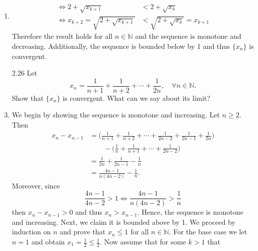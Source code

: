 \documentclass[12pt]{article}
\makeatletter
\theoremstyle{definition}
\theoremstyle{remark}
\renewenvironment{proof}[1][\proofname]{\par
  \pushQED{\qed}%
  \normalfont \topsep6\p@\@plus6\p@\relax
  \list{}{\leftmargin=0mm
          \rightmargin=4mm
          \settowidth{\itemindent}{\itshape#1}%
          \labelwidth=\itemindent
          \parsep=0pt \listparindent=\parindent 
  }
  \item[\hskip\labelsep
        \itshape
    #1\@addpunct{.}]\ignorespaces
}{%
  \popQED\endlist\@endpefalse
}
\let\oldproofname=\proofname
\renewcommand{\proofname}{\bf{\textit{\oldproofname}}}
\makeatother
\begin{document}
\begin{enumerate}[leftmargin=*]
\begin{proof}
\begin{equation*}
\begin{split}
                                \Leftrightarrow2+\sqrt{x_{k+1}}&<2+\sqrt{x_k} \\
                                \Leftrightarrow x_{k+2}=\sqrt{2+\sqrt{x_{k+1}}}&<\sqrt{2+\sqrt{x_k}}=x_{k+1}
                            \end{split}
                        \end{equation*}
                    Therefore the result holds for all $n\in\mathbb{N}$ and the sequence is monotone and decreasing. Additionally, the sequence is bounded below by 1 and thus $\{x_n\}$ is convergent.
                \end{proof}
            \item[2.26] Let 
                \begin{equation*}
                    x_n=\frac{1}{n+1}+\frac{1}{n+2}+\cdots+\frac{1}{2n}, \quad\forall n\in\mathbb{N}.
                \end{equation*}
                Show that $\{x_n\}$ is convergent. What can we say about its limit?
                \begin{proof}
                    We begin by showing the sequence is monotone and increasing. Let $n\geq 2$. Then 
                        \begin{equation*}
                            \begin{split}
                                x_{n}-x_{n-1}&=\bigg(\frac{1}{n+1}+\frac{1}{n+2}+\cdots+\frac{1}{2n-2}+\frac{1}{2n-1}+\frac{1}{2n}\bigg)\\
                                &\quad\quad-\bigg(\frac{1}{n}+\frac{1}{n+1}+\cdots+\frac{1}{2n-2}\bigg) \\
                                &=\frac{1}{2n}+\frac{1}{2n-1}-\frac{1}{n} \\
                                &= \frac{4n-1}{n(4n-2)}-\frac{1}{n}.
                            \end{split}
                        \end{equation*}\newpage
                    Moreover, since 
                        \begin{equation*}
                            \frac{4n-1}{4n-2}>1\Leftrightarrow \frac{4n-1}{n(4n-2)}>\frac{1}{n}
                        \end{equation*}
                    then $x_n-x_{n-1}>0$ and thus $x_n>x_{n-1}$. Hence, the sequence is monotone and increasing. Next, we claim it is bounded above by 1. We proceed by induction on $n$ and prove that $x_n\leq 1$ for all $n\in\mathbb{N}$. For the base case we let $n=1$ and obtain $x_1=\frac{1}{2}\leq \frac{1}{2}$. Now assume that for some $k>1$ that 

\end{proof}
\end{enumerate}
\end{document}
